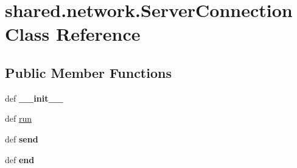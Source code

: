 \hypertarget{classshared_1_1network_1_1_server_connection}{\section{shared.\-network.\-Server\-Connection \-Class \-Reference}
\label{classshared_1_1network_1_1_server_connection}
}
\subsection*{\-Public \-Member \-Functions}
\begin{DoxyCompactItemize}
\item 
\hypertarget{classshared_1_1network_1_1_server_connection_ac01ae0e60405df5978c4126e6808fa65}{def {\bfseries \-\_\-\-\_\-init\-\_\-\-\_\-}}\label{classshared_1_1network_1_1_server_connection_ac01ae0e60405df5978c4126e6808fa65}

\item 
def \hyperlink{classshared_1_1network_1_1_server_connection_aa0474c6008d22f2206972c69c6519f4e}{run}
\item 
\hypertarget{classshared_1_1network_1_1_server_connection_a47a134eb204dd368e4ea2082d03fb56d}{def {\bfseries send}}\label{classshared_1_1network_1_1_server_connection_a47a134eb204dd368e4ea2082d03fb56d}

\item 
\hypertarget{classshared_1_1network_1_1_server_connection_a4bbc2f1400353184d2a162c89120fe20}{def {\bfseries end}}\label{classshared_1_1network_1_1_server_connection_a4bbc2f1400353184d2a162c89120fe20}

\end{DoxyCompactItemize}
